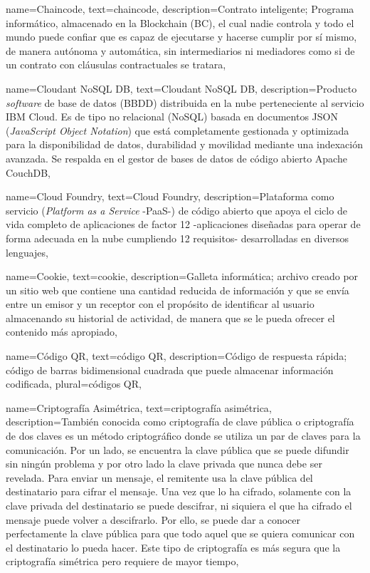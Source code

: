 {
    name={Chaincode},
    text={chaincode},
    description={Contrato inteligente; Programa informático, almacenado en la Blockchain (BC), el cual nadie controla y todo el mundo puede confiar que es capaz de ejecutarse y hacerse cumplir por sí mismo, de manera autónoma y automática, sin intermediarios ni mediadores como si de un contrato con cláusulas contractuales se tratara},
}

{
    name={Cloudant NoSQL DB},
    text={Cloudant NoSQL DB},
    description={Producto \textit{software} de base de datos (BBDD) distribuida en la nube perteneciente al servicio IBM Cloud. Es de tipo no relacional (NoSQL) basada en documentos JSON (\textit{JavaScript Object Notation}) que está completamente gestionada y optimizada para la disponibilidad de datos, durabilidad y movilidad mediante una indexación avanzada. Se respalda en el gestor de bases de datos de código abierto Apache CouchDB},
}

{
    name={Cloud Foundry},
    text={Cloud Foundry},
    description={Plataforma como servicio (\textit{Platform as a Service} -PaaS-) de código abierto que apoya el ciclo de vida completo de aplicaciones de factor 12 -aplicaciones diseñadas para operar de forma adecuada en la nube cumpliendo 12 requisitos- desarrolladas en diversos lenguajes},
}

{
    name={Cookie},
    text={cookie},
    description={Galleta informática; archivo creado por un sitio web que contiene una cantidad reducida de información y que se envía entre un emisor y un receptor con el propósito de identificar al usuario almacenando su historial de actividad, de manera que se le pueda ofrecer el contenido más apropiado},
}

{
    name={Código QR},
    text={código QR},
    description={Código de respuesta rápida; código de barras bidimensional cuadrada que puede almacenar información codificada},
    plural={códigos QR},
}

{
    name={Criptografía Asimétrica},
    text={criptografía asimétrica},
    description={También conocida como criptografía de clave pública o criptografía de dos claves es un método criptográfico donde se utiliza un par de claves para la comunicación. Por un lado, se encuentra la clave pública que se puede difundir sin ningún problema y por otro lado la clave privada que nunca debe ser revelada. Para enviar un mensaje, el remitente usa la clave pública del destinatario para cifrar el mensaje. Una vez que lo ha cifrado, solamente con la clave privada del destinatario se puede descifrar, ni siquiera el que ha cifrado el mensaje puede volver a descifrarlo. Por ello, se puede dar a conocer perfectamente la clave pública para que todo aquel que se quiera comunicar con el destinatario lo pueda hacer. Este tipo de criptografía es más segura que la criptografía simétrica pero requiere de mayor tiempo},
}

